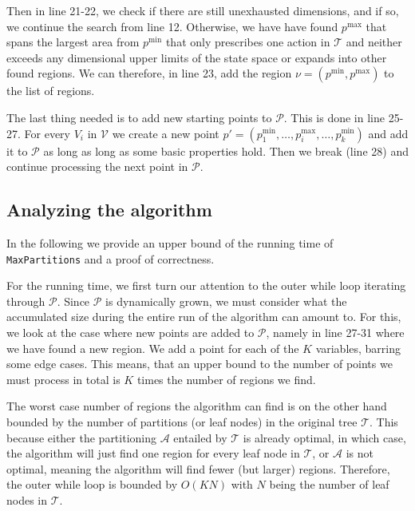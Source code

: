 \begin{algorithm}[!ht]
\begin{algorithmic}[1]

                \EndIf%

            \EndFor%
        \EndWhile%


        \EndFunction%
    \end{algorithmic}

\end{algorithm}

Then in line 21-22, we check if there are still unexhausted dimensions, and if
so, we continue the search from line 12. Otherwise, we have have found
$p^{\max}$ that spans the largest area from $p^{\min}$ that only prescribes one
action in $\mathcal{T}$ and neither exceeds any dimensional upper limits of the
state space or expands into other found regions. We can therefore, in line 23,
add the region $\nu = (p^{\min},p^{\max})$ to the list of regions.

The last thing needed is to add new starting points to $\mathcal{P}$. This is
done in line 25-27. For every $V_i$ in $\mathcal{V}$ we create a new point $p' =
(p^{\min}_1, \ldots, p^{\max}_i, \ldots, p^{\min}_k)$ and add it to
$\mathcal{P}$ as long as long as some basic properties hold. Then we break (line
28) and continue processing the next point in $\mathcal{P}$.


\subsection{Analyzing the algorithm}%
\label{sub:maxPartsAnalysis}

In the following we provide an upper bound of the running time of
\texttt{MaxPartitions} and a proof of correctness.

For the running time, we first turn our attention to the outer while loop
iterating through $\mathcal{P}$. Since $\mathcal{P}$ is dynamically grown, we
must consider what the accumulated size during the entire run of the algorithm
can amount to. For this, we look at the case where new points are added to
$\mathcal{P}$, namely in line 27-31 where we have found a new region. We add a
point for each of the $K$ variables, barring some edge cases. This means, that
an upper bound to the number of points we must process in total is $K$ times the
number of regions we find.

The worst case number of regions the algorithm can find is on the other hand
bounded by the number of partitions (or leaf nodes) in the original tree
$\mathcal{T}$. This because either the partitioning $\mathcal{A}$ entailed by
$\mathcal{T}$ is already optimal, in which case, the algorithm will just find
one region for every leaf node in $\mathcal{T}$, or $\mathcal{A}$ is not
optimal, meaning the algorithm will find fewer (but larger) regions. Therefore,
the outer while loop is bounded by $O(KN)$ with $N$ being the number of leaf
nodes in $\mathcal{T}$.

